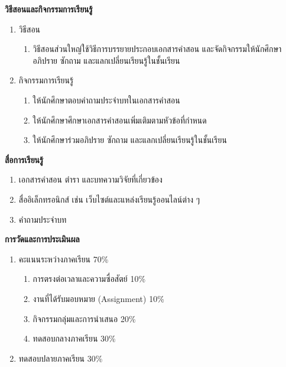 \newpage
\noindent
\textbf{\normalsize วิธีสอนและกิจกรรมการเรียนรู้}
\begin{enumerate}
    \item วิธีสอน
    \begin{enumerate}
        \item วิธีสอนส่วนใหญ่ใช้วิธีการบรรยายประกอบเอกสารคำสอน และจัดกิจกรรมให้นักศึกษาอภิปราย ซักถาม และแลกเปลี่ยนเรียนรู้ในชั้นเรียน
    \end{enumerate}
    \item กิจกรรมการเรียนรู้
    \begin{enumerate}
        \item ให้นักศึกษาตอบคำถามประจำบทในเอกสารคำสอน
        \item ให้นักศึกษาศึกษาเอกสารคำสอนเพิ่มเติมตามหัวข้อที่กำหนด
        \item ให้นักศึกษาร่วมอภิปราย ซักถาม และแลกเปลี่ยนเรียนรู้ในชั้นเรียน
    \end{enumerate}
\end{enumerate}

\noindent
\textbf{\normalsize สื่อการเรียนรู้}
\begin{enumerate}
    \item เอกสารคำสอน ตำรา และบทความวิจัยที่เกี่ยวข้อง
    \item สื่ออิเล็กทรอนิกส์ เช่น เว็บไซต์และแหล่งเรียนรู้ออนไลน์ต่าง ๆ
    \item คำถามประจำบท
\end{enumerate}

\noindent
\textbf{\normalsize การวัดและการประเมินผล}
\begin{enumerate}
    \item คะแนนระหว่างภาคเรียน \hfill 70\%
    \begin{enumerate}
        \item การตรงต่อเวลาและความซื่อสัตย์ \hfill 10\%
        \item งานที่ได้รับมอบหมาย (Assignment) \hfill 10\%
        \item กิจกรรมกลุ่มและการนำเสนอ \hfill 20\%
        \item ทดสอบกลางภาคเรียน \hfill 30\%
    \end{enumerate}
    \item ทดสอบปลายภาคเรียน \hfill 30\%
\end{enumerate}

